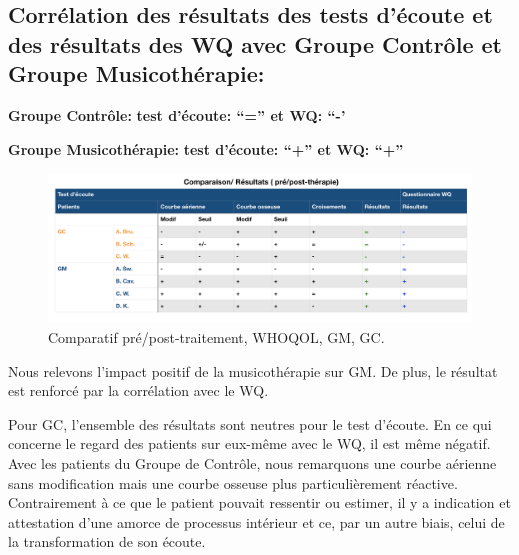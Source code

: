   \subsection{Corrélation des résultats des tests d'écoute et des
    résultats des WQ avec Groupe Contrôle et
    Groupe Musicothérapie:}
\textbf{Groupe Contrôle:} 	          \textbf{ test d'écoute: ``=''   et    WQ: ``-'}

 
\textbf{Groupe Musicothérapie:}     \textbf{test d'écoute: ``+''      et    WQ: ``+''}


 \begin{figure}[th]
\centering
\includegraphics[width=1\linewidth]{images/graphiques/comparaison_pre_post.png}
\caption[Corrélation résultats pré/post]{Comparatif
  pré/post-traitement, WHOQOL, GM, GC.}
       
\label{comparaison_pre_post}
\end{figure}



                Nous relevons l'impact positif de la
                musicothérapie sur GM.
                De plus, le résultat est renforcé par la corrélation
                avec le WQ.

                
                Pour GC, l'ensemble des résultats sont neutres pour le
                test d'écoute. En ce qui concerne le
                regard des patients sur eux-même avec le WQ, il est
                même négatif. Avec les patients du Groupe de
              Contrôle, nous remarquons une courbe aérienne
              sans modification mais une courbe osseuse plus
              particulièrement réactive. Contrairement à
              ce que le patient pouvait ressentir ou estimer, il y a indication  et attestation d'une amorce de
              processus intérieur et ce, par un autre biais, celui de
              la transformation de son 
              écoute.
              
